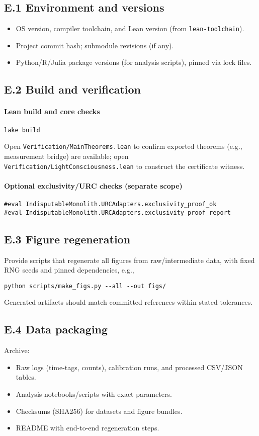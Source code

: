 \documentclass[12pt,a4paper]{article}
\begin{document}
\subsection*{E.1 Environment and versions}
\begin{itemize}
  \item OS version, compiler toolchain, and Lean version (from \texttt{lean-toolchain}).
  \item Project commit hash; submodule revisions (if any).
  \item Python/R/Julia package versions (for analysis scripts), pinned via lock files.
\end{itemize}

\subsection*{E.2 Build and verification}
\paragraph{Lean build and core checks}
\begin{verbatim}
lake build
\end{verbatim}
Open \texttt{Verification/MainTheorems.lean} to confirm exported theorems (e.g., measurement bridge) are available; open \texttt{Verification/LightConsciousness.lean} to construct the certificate witness.

\paragraph{Optional exclusivity/URC checks (separate scope)}
\begin{verbatim}
#eval IndisputableMonolith.URCAdapters.exclusivity_proof_ok
#eval IndisputableMonolith.URCAdapters.exclusivity_proof_report
\end{verbatim}

\subsection*{E.3 Figure regeneration}
Provide scripts that regenerate all figures from raw/intermediate data, with fixed RNG seeds and pinned dependencies, e.g.,
\begin{verbatim}
python scripts/make_figs.py --all --out figs/
\end{verbatim}
Generated artifacts should match committed references within stated tolerances.

\subsection*{E.4 Data packaging}
Archive:
\begin{itemize}
  \item Raw logs (time-tags, counts), calibration runs, and processed CSV/JSON tables.
  \item Analysis notebooks/scripts with exact parameters.
  \item Checksums (SHA256) for datasets and figure bundles.
  \item README with end-to-end regeneration steps.
\end{itemize}
\end{document}
